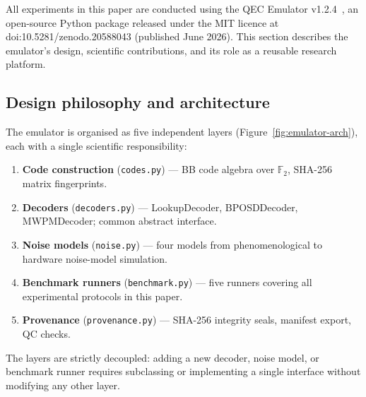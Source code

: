\documentclass[11pt,a4paper]{article}
\begin{document}
All experiments in this paper are conducted using the QEC Emulator
v1.2.4~\cite{AlDaajeh2026emulator}, an open-source Python package
released under the MIT licence at
doi:10.5281/zenodo.20588043 (published June 2026).
This section describes the emulator's design, scientific contributions,
and its role as a reusable research platform.

\subsection{Design philosophy and architecture}

The emulator is organised as five independent layers
(Figure~\ref{fig:emulator-arch}), each with a single scientific
responsibility:

\begin{enumerate}[leftmargin=1.6em,label=\textbf{L\arabic*.}]
  \item \textbf{Code construction} (\texttt{codes.py}) ---
    BB code algebra over $\mathbb{F}_2$, SHA-256 matrix fingerprints.
  \item \textbf{Decoders} (\texttt{decoders.py}) ---
    LookupDecoder, BPOSDDecoder, MWPMDecoder; common abstract interface.
  \item \textbf{Noise models} (\texttt{noise.py}) ---
    four models from phenomenological to hardware noise-model simulation.
  \item \textbf{Benchmark runners} (\texttt{benchmark.py}) ---
    five runners covering all experimental protocols in this paper.
  \item \textbf{Provenance} (\texttt{provenance.py}) ---
    SHA-256 integrity seals, manifest export, QC checks.
\end{enumerate}

The layers are strictly decoupled: adding a new decoder, noise model,
or benchmark runner requires subclassing or implementing a single
interface without modifying any other layer.
\end{document}
